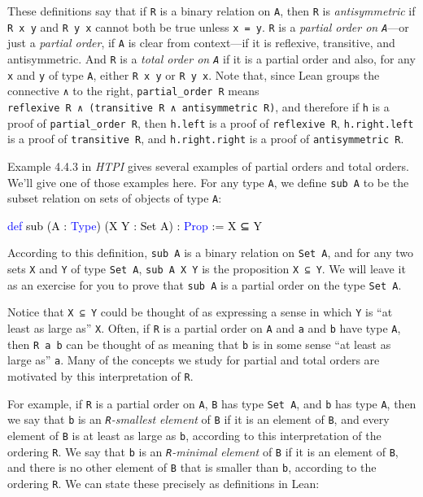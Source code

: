 \documentclass[
  letterpaper,
  DIV=11,
  numbers=noendperiod]{scrreprt}
\newenvironment{Shaded}{\begin{snugshade}}{\end{snugshade}}
\newcommand{\KeywordTok}[1]{\textcolor[rgb]{0.00,0.23,0.31}{#1}}
\newcommand{\NormalTok}[1]{\textcolor[rgb]{0.00,0.23,0.31}{#1}}
\renewcommand{\NormalTok}[1]{\textcolor[HTML]{000000}{#1}}
\renewcommand{\KeywordTok}[1]{\textcolor[HTML]{0000FF}{#1}}
\theoremstyle{remark}
\begin{document}
These definitions say that if \texttt{R} is a binary relation on
\texttt{A}, then \texttt{R} is \emph{antisymmetric} if \texttt{R\ x\ y}
and \texttt{R\ y\ x} cannot both be true unless \texttt{x\ =\ y}.
\texttt{R} is a \emph{partial order on \texttt{A}}---or just a
\emph{partial order}, if \texttt{A} is clear from context---if it is
reflexive, transitive, and antisymmetric. And \texttt{R} is a
\emph{total order on \texttt{A}} if it is a partial order and also, for
any \texttt{x} and \texttt{y} of type \texttt{A}, either
\texttt{R\ x\ y} or \texttt{R\ y\ x}. Note that, since Lean groups the
connective \texttt{∧} to the right, \texttt{partial\_order\ R} means
\texttt{reflexive\ R\ ∧\ (transitive\ R\ ∧\ antisymmetric\ R)}, and
therefore if \texttt{h} is a proof of \texttt{partial\_order\ R}, then
\texttt{h.left} is a proof of \texttt{reflexive\ R},
\texttt{h.right.left} is a proof of \texttt{transitive\ R}, and
\texttt{h.right.right} is a proof of \texttt{antisymmetric\ R}.

Example 4.4.3 in \emph{HTPI} gives several examples of partial orders
and total orders. We'll give one of those examples here. For any type
\texttt{A}, we define \texttt{sub\ A} to be the subset relation on sets
of objects of type \texttt{A}:

\begin{Shaded}
\begin{Highlighting}[]
\KeywordTok{def}\NormalTok{ sub (A : }\KeywordTok{Type}\NormalTok{) (X Y : Set A) : }\KeywordTok{Prop}\NormalTok{ := X ⊆ Y}
\end{Highlighting}
\end{Shaded}

According to this definition, \texttt{sub\ A} is a binary relation on
\texttt{Set\ A}, and for any two sets \texttt{X} and \texttt{Y} of type
\texttt{Set\ A}, \texttt{sub\ A\ X\ Y} is the proposition
\texttt{X\ ⊆\ Y}. We will leave it as an exercise for you to prove that
\texttt{sub\ A} is a partial order on the type \texttt{Set\ A}.

Notice that \texttt{X\ ⊆\ Y} could be thought of as expressing a sense
in which \texttt{Y} is ``at least as large as'' \texttt{X}. Often, if
\texttt{R} is a partial order on \texttt{A} and \texttt{a} and
\texttt{b} have type \texttt{A}, then \texttt{R\ a\ b} can be thought of
as meaning that \texttt{b} is in some sense ``at least as large as''
\texttt{a}. Many of the concepts we study for partial and total orders
are motivated by this interpretation of \texttt{R}.

For example, if \texttt{R} is a partial order on \texttt{A}, \texttt{B}
has type \texttt{Set\ A}, and \texttt{b} has type \texttt{A}, then we
say that \texttt{b} is an \emph{\texttt{R}-smallest element} of
\texttt{B} if it is an element of \texttt{B}, and every element of
\texttt{B} is at least as large as \texttt{b}, according to this
interpretation of the ordering \texttt{R}. We say that \texttt{b} is an
\emph{\texttt{R}-minimal element} of \texttt{B} if it is an element of
\texttt{B}, and there is no other element of \texttt{B} that is smaller
than \texttt{b}, according to the ordering \texttt{R}. We can state
these precisely as definitions in Lean:
\end{document}
